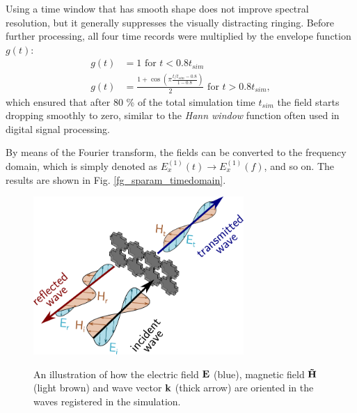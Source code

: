 Using a time window that has smooth shape does not improve spectral resolution, but it generally suppresses the visually distracting ringing. Before further processing, all four time records were multiplied by the envelope function $g(t)$:
\begin{equation} 
\begin{split}
	g(t) 	& = 1 \text{ for } t < 0.8 t_{sim} \\
	g(t)    & = \frac{1 + \cos\left(\pi \frac{t/t_{sim}-0.8}{1-0.8}\right)}{2}  \text{ for } t > 0.8 t_{sim},
\end{split}
\label{eq_envelope}\end{equation}
which ensured that after 80 \% of the total simulation time $t_{sim}$ the field starts dropping smoothly to zero, similar to the \textit{Hann window} function often used in digital signal processing.

By means of the Fourier transform, the fields can be converted to the frequency domain, which is simply denoted as $E_{x}^{(1)}(t) \rightarrow E_{x}^{(1)}(f)$, and so on. The results are shown in Fig. \ref{fg_sparam_timedomain}. 
\begin{figure}[h] \caption{An illustration of how the electric field $\mathbf{E}$ (blue), magnetic field $\mathbf{\tilde{H}}$ (light brown) and wave vector ${\mathbf{k}}$ (thick arrow) are oriented in the waves registered in the simulation.}  \centering \includegraphics[width=8cm]{img/sim_separating_wave.pdf} \label{fg_separating_wave}\end{figure}

